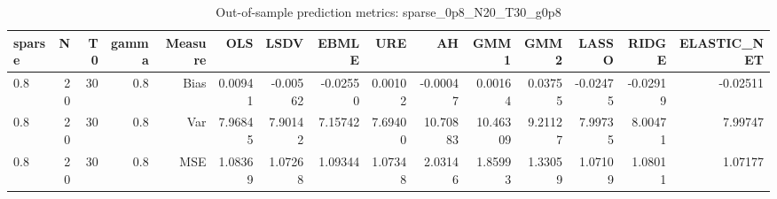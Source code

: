 \begin{table}[!htbp]\centering
\caption{Out-of-sample prediction metrics: sparse_0p8_N20_T30_g0p8}
\label{tab:table3_sparse_0p8_N20_T30_g0p8}
\begin{tabular}{lrrrrrrrrrrrrrr}
\hline
sparse & N & T0 & gamma & Measure & OLS & LSDV & EBMLE & URE & AH & GMM1 & GMM2 & LASSO & RIDGE & ELASTIC_NET \\
\hline
0.8 & 20 & 30 & 0.8 & Bias & 0.00941 & -0.00562 & -0.02550 & 0.00102 & -0.00047 & 0.00164 & 0.03755 & -0.02475 & -0.02919 & -0.02511 \\
0.8 & 20 & 30 & 0.8 & Var & 7.96845 & 7.90142 & 7.15742 & 7.69400 & 10.70883 & 10.46309 & 9.21127 & 7.99735 & 8.00471 & 7.99747 \\
0.8 & 20 & 30 & 0.8 & MSE & 1.08369 & 1.07268 & 1.09344 & 1.07348 & 2.03146 & 1.85993 & 1.33059 & 1.07109 & 1.08011 & 1.07177 \\
\hline
\end{tabular}
\end{table}

